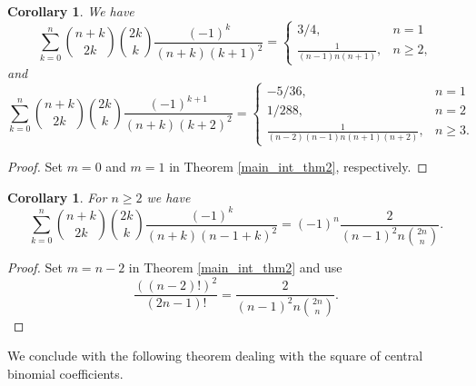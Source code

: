 \documentclass[11pt,reqno]{amsart}
\theoremstyle{plain}
\numberwithin{equation}{section}
\newtheorem{corollary}[thm]{Corollary}
\begin{document}
\begin{corollary}
We have
\begin{equation}
\sum_{k=0}^{n} \binom{n+k}{2k} \binom{2k}{k} \frac{(-1)^k}{(n+k)(k+1)^2} = 
\begin{cases}
3/4, & n=1 \\ 
\frac{1}{(n-1)n(n+1)}, & n\geq 2,
\end{cases} 
\end{equation}
and
\begin{equation}
\sum_{k=0}^{n} \binom{n+k}{2k} \binom{2k}{k} \frac{(-1)^{k+1}}{(n+k)(k+2)^2} = 
\begin{cases}
-5/36, & n=1 \\ 
1/288, & n=2 \\
\frac{1}{(n-2)(n-1)n(n+1)(n+2)}, & n\geq 3.
\end{cases} 
\end{equation}
\end{corollary}
\begin{proof}
Set $m=0$ and $m=1$ in Theorem \ref{main_int_thm2}, respectively.
\end{proof}

\begin{corollary}
For $n\geq 2$ we have
\begin{equation}
\sum_{k=0}^{n} \binom{n+k}{2k} \binom{2k}{k} \frac{(-1)^k}{(n+k)(n-1+k)^2} = (-1)^n \frac{2}{(n-1)^2 n \binom{2n}{n}}.
\end{equation}
\end{corollary}
\begin{proof}
Set $m=n-2$ in Theorem \ref{main_int_thm2} and use 
$$\frac{((n-2)!)^2}{(2n-1)!} = \frac{2}{(n-1)^2 n \binom{2n}{n}}.$$
\end{proof}

We conclude with the following theorem dealing with the square of central binomial coefficients.
\end{document}
